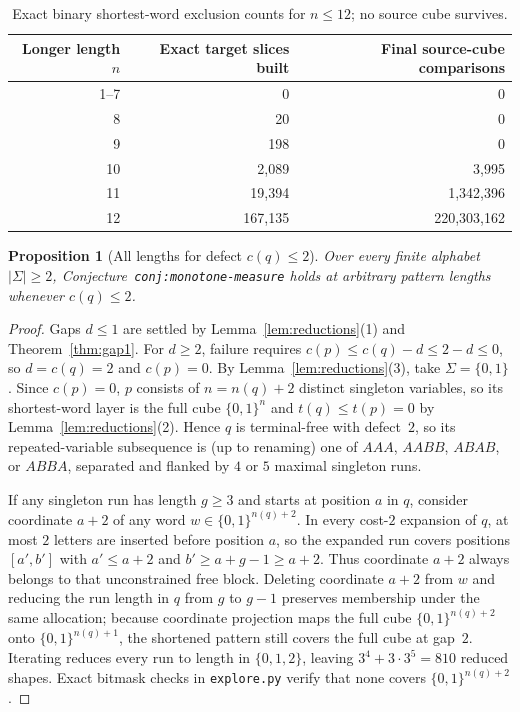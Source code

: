 \documentclass[11pt]{article}
\theoremstyle{plain}
\newtheorem{proposition}[theorem]{Proposition}
\theoremstyle{definition}
\theoremstyle{remark}
\begin{document}
\begin{table}[h]
\centering
\begin{tabular}{@{}rrr@{}}
\toprule
Longer length $n$ & Exact target slices built & Final source-cube comparisons \\
\midrule
1--7 & 0 & 0 \\
8 & 20 & 0 \\
9 & 198 & 0 \\
10 & 2,089 & 3,995 \\
11 & 19,394 & 1,342,396 \\
12 & 167,135 & 220,303,162 \\
\bottomrule
\end{tabular}
\caption{Exact binary shortest-word exclusion counts for $n \le 12$; no source cube survives.}\label{tab:n12}
\end{table}

\begin{proposition}[All lengths for defect $c(q) \le 2$]\label{prop:defect2}
Over every finite alphabet $|\Sigma| \ge 2$, Conjecture~\texttt{conj:monotone-measure} holds at arbitrary pattern lengths whenever $c(q) \le 2$.
\end{proposition}

\begin{proof}
Gaps $d \le 1$ are settled by Lemma~\ref{lem:reductions}(1) and Theorem~\ref{thm:gap1}.
For $d \ge 2$, failure requires $c(p) \le c(q) - d \le 2 - d \le 0$, so $d = c(q) = 2$ and $c(p) = 0$.
By Lemma~\ref{lem:reductions}(3), take $\Sigma = \{0,1\}$.
Since $c(p) = 0$, $p$ consists of $n = n(q) + 2$ distinct singleton variables, so its shortest-word layer is the full cube $\{0,1\}^n$ and $t(q) \le t(p) = 0$ by Lemma~\ref{lem:reductions}(2).
Hence $q$ is terminal-free with defect~$2$, so its repeated-variable subsequence is (up to renaming) one of $AAA$, $AABB$, $ABAB$, or $ABBA$, separated and flanked by $4$ or $5$ maximal singleton runs.

If any singleton run has length $g \ge 3$ and starts at position $a$ in $q$, consider coordinate $a + 2$ of any word $w \in \{0,1\}^{n(q)+2}$.
In every cost-$2$ expansion of $q$, at most $2$ letters are inserted before position $a$, so the expanded run covers positions $[a', b']$ with $a' \le a + 2$ and $b' \ge a + g - 1 \ge a + 2$.
Thus coordinate $a + 2$ always belongs to that unconstrained free block.
Deleting coordinate $a + 2$ from $w$ and reducing the run length in $q$ from $g$ to $g - 1$ preserves membership under the same allocation; because coordinate projection maps the full cube $\{0,1\}^{n(q)+2}$ onto $\{0,1\}^{n(q)+1}$, the shortened pattern still covers the full cube at gap~$2$.
Iterating reduces every run to length in $\{0, 1, 2\}$, leaving $3^4 + 3 \cdot 3^5 = 810$ reduced shapes.
Exact bitmask checks in \texttt{explore.py} verify that none covers $\{0,1\}^{n(q)+2}$.
\end{proof}
\end{document}
